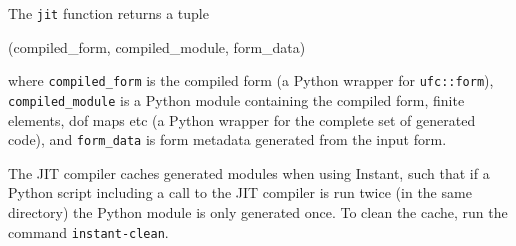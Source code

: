 The \texttt{jit} function returns a tuple
\begin{code}
(compiled_form, compiled_module, form_data)
\end{code}
where \texttt{compiled\_form} is the compiled form (a Python wrapper
for \texttt{ufc::form}), \texttt{compiled\_module} is a Python module
containing the compiled form, finite elements, dof maps etc (a Python
wrapper for the complete set of generated code), and
\texttt{form\_data} is form metadata generated from the input form.

The JIT compiler caches generated modules when using Instant,
such that if a Python script including a call to the JIT compiler is
run twice (in the same directory) the Python module is only generated
once. To clean the cache, run the command \texttt{instant-clean}.
